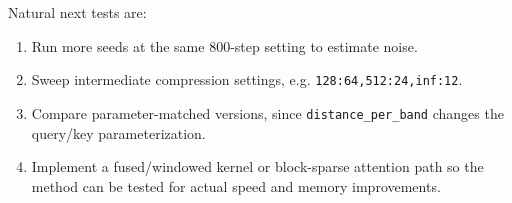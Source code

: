 \documentclass[11pt]{article}
\begin{document}
Natural next tests are:

\begin{enumerate}
    \item Run more seeds at the same 800-step setting to estimate noise.
    \item Sweep intermediate compression settings, e.g. \texttt{128:64,512:24,inf:12}.
    \item Compare parameter-matched versions, since \texttt{distance\_per\_band} changes the query/key parameterization.
    \item Implement a fused/windowed kernel or block-sparse attention path so the method can be tested for actual speed and memory improvements.
\end{enumerate}
\end{document}
